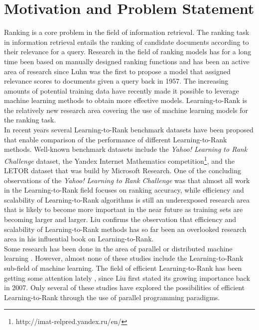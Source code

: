 \chapter{Motivation and Problem Statement}
Ranking is a core problem in the field of information retrieval. The ranking task in information retrieval entails the ranking of candidate documents according to their relevance for a query. Research in the field of ranking models has for a long time been based on manually designed ranking functions and has been an active area of research since Luhn\cite{Luhn1957} was the first to propose a model that assigned relevance scores to documents given a query back in 1957. The increasing amounts of potential training data have recently made it possible to leverage machine learning methods to obtain more effective models. Learning-to-Rank is the relatively new research area covering the use of machine learning models for the ranking task.\\

In recent years several Learning-to-Rank benchmark datasets have been proposed that enable comparison of the performance of different Learning-to-Rank methods. Well-known benchmark datasets include the \emph{Yahoo! Learning to Rank Challenge} dataset\cite{Chapelle2011a}, the Yandex Internet Mathematics competition\footnote{http://imat-relpred.yandex.ru/en/}, and the LETOR dataset\cite{Qin2010} that was build by Microsoft Research. One of the concluding observations of the \emph{Yahoo! Learning to Rank Challenge} was that almost all work in the Learning-to-Rank field focuses on ranking accuracy, while efficiency and scalability of Learning-to-Rank algorithms is still an underexposed research area that is likely to become more important in the near future as training sets are becoming larger and larger\cite{Chapelle2011b}. Liu\cite{Liu2007} confirms the observation that efficiency and scalability of Learning-to-Rank methods has so far been an overlooked research area in his influential book on Learning-to-Rank.\\

Some research has been done in the area of parallel or distributed machine learning \cite{Chu2007,Chang2007}. However, almost none of these studies include the Learning-to-Rank sub-field of machine learning. The field of efficient Learning-to-Rank has been getting some attention lately \cite{Asadi2013a,Asadi2013b,Busa-Fekete2012,Sousa2012,Shukla2012}, since Liu \cite{Liu2007} first stated its growing importance back in 2007. Only several of these studies \cite{Sousa2012,Shukla2012} have explored the possibilities of efficient Learning-to-Rank through the use of parallel programming paradigms.\\


